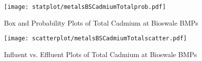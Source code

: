         \begin{figure}[hb]   %
            \centering
            \texttt{[image: statplot/metalsBSCadmiumTotalprob.pdf]}
            \caption{Box and Probability Plots of Total Cadmium at Bioswale BMPs}
        \end{figure}         %
        
        
        \begin{figure}[hb]   %
            \centering
            \texttt{[image: scatterplot/metalsBSCadmiumTotalscatter.pdf]}
            \caption{Influent vs. Effluent Plots of Total Cadmium at Bioswale BMPs}
        \end{figure}         %
        \clearpage
        